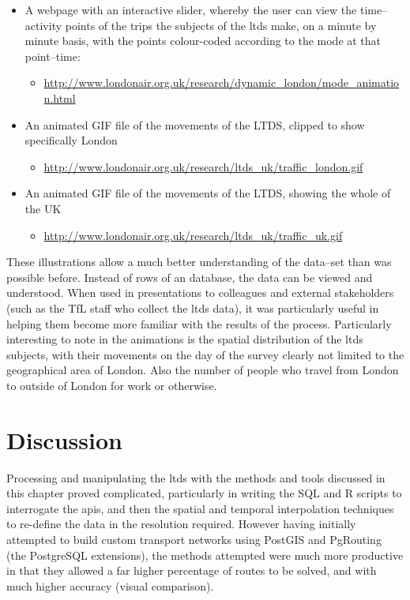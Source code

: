 \begin{itemize}
\item A webpage with an interactive slider, whereby the user can view the time--activity points of the trips the subjects of the \gls{ltds} make, on a minute by minute basis, with the points colour-coded according to the mode at that point--time:
\begin{itemize}
\item \url{http://www.londonair.org.uk/research/dynamic_london/mode_animation.html}
\end{itemize}
\item An animated GIF file of the movements of the LTDS, clipped to show specifically London
\begin{itemize}
\item \url{http://www.londonair.org.uk/research/ltds_uk/traffic_london.gif}
\end{itemize}
\item An animated GIF file of the movements of the LTDS, showing the whole of the UK
\begin{itemize}
\item \url{http://www.londonair.org.uk/research/ltds_uk/traffic_uk.gif}
\end{itemize}
\end{itemize}

These illustrations allow a much better understanding of the data--set than was possible before. Instead of rows of an database, the data can be viewed and understood. When used in presentations to colleagues and external stakeholders (such as the TfL staff who collect the \gls{ltds} data), it was particularly useful in helping them become more familiar with the results of the process. Particularly interesting to note in the animations is the spatial distribution of the \gls{ltds} subjects, with their movements on the day of the survey clearly not limited to the geographical area of London. Also the number of people who travel from London to outside of London for work or otherwise.

\section{Discussion}
\label{sec:1Discussion}

Processing and manipulating the \gls{ltds} with the methods and tools discussed in this chapter proved complicated, particularly in writing the SQL and R scripts to interrogate the \gls{api}s, and then the spatial and temporal interpolation techniques to re-define the data in the resolution required. However having initially attempted to build custom transport networks using PostGIS and PgRouting (the PostgreSQL extensions), the methods attempted were much more productive in that they allowed a far higher percentage of routes to be solved, and with much higher accuracy (visual comparison). 

